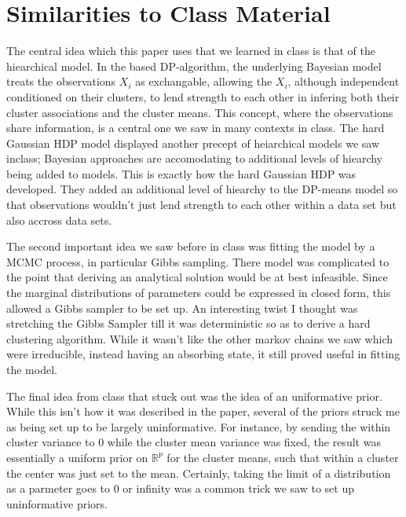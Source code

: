 \documentclass[11pt]{article}
\newcommand{\R}{\mathbb{R}}
\theoremstyle{definition}
\begin{document}
\section{Similarities to Class Material}
The central idea which this paper uses that we learned in class is that of the hiearchical model. In the based DP-algorithm, the underlying Bayesian model treats the observations $X_i$ as exchangable, allowing the $X_i$, although independent conditioned on their clusters, to lend strength to each other in infering both their cluster associations and the cluster means. This concept, where the observations share information, is a central one we saw in many contexts in class. The hard Gaussian HDP model displayed another precept of heiarchical models we saw inclass; Bayesian approaches are accomodating to additional levels of hiearchy being added to models. This is exactly how the hard Gaussian HDP was developed. They added an additional level of hiearchy to the DP-means model so that observations wouldn't just lend strength to each other within a data set but also accross data sets.\par
The second important idea we saw before in class was fitting the model by a MCMC process, in particular Gibbs sampling. There model was complicated to the point that deriving an analytical solution would be at best infeasible. Since the marginal distributions of parameters could be expressed in closed form, this allowed a Gibbs sampler to be set up. An interesting twist I thought was stretching the Gibbs Sampler till it was deterministic so as to derive a hard clustering algorithm. While it wasn't like the other markov chains we saw which were irreducible, instead having an absorbing state, it still proved useful in fitting the model. \par
The final idea from class that stuck out was the idea of an uniformative prior. While this isn't how it was described in the paper, several of the priors struck me as being set up to be largely uninformative. For instance, by sending the within cluster variance to 0 while the cluster mean variance was fixed, the result was essentially a uniform prior on $\R^p$ for the cluster means, such that within a cluster the center was just set to the mean. Certainly, taking the limit of a distribution as a parmeter goes to 0 or infinity was a common trick we saw to set up uninformative priors.
\end{document}
